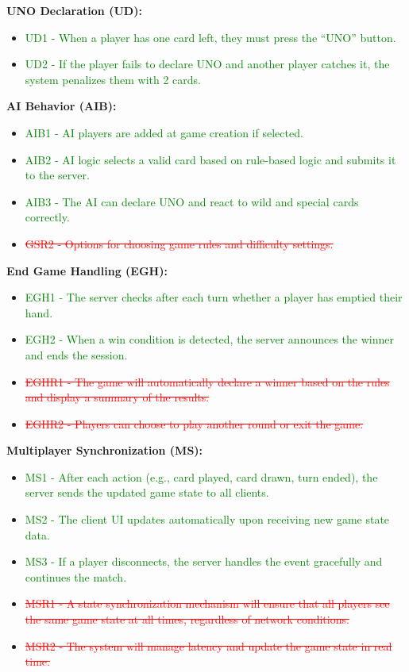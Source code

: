 \documentclass[12pt]{article}
\newcommand{\removed}[1]{\textcolor{red}{\sout{#1}}}
\newcommand{\added}[1]{\textcolor{green}{#1}}
\begin{document}
\textbf{UNO Declaration (UD):}
\begin{itemize}
    \item \added{UD1 - When a player has one card left, they must press the “UNO” button.}
    \item \added{UD2 - If the player fails to declare UNO and another player catches it, the system penalizes them with 2 cards.}
\end{itemize}

\textbf{AI Behavior (AIB):}
\begin{itemize}
    \item \added{AIB1 - AI players are added at game creation if selected.}
    \item \added{AIB2 - AI logic selects a valid card based on rule-based logic and submits it to the server.}
    \item \added{AIB3 - The AI can declare UNO and react to wild and special cards correctly.}
    \item \removed{GSR2 - Options for choosing game rules and difficulty settings.}
\end{itemize}

\textbf{End Game Handling (EGH):}
\begin{itemize}
    \item \added{EGH1 - The server checks after each turn whether a player has emptied their hand.}
    \item \added{EGH2 - When a win condition is detected, the server announces the winner and ends the session.}
    \item \removed{EGHR1 - The game will automatically declare a winner based on the rules and display a summary of the results.}
    \item \removed{EGHR2 - Players can choose to play another round or exit the game.}
\end{itemize}

\textbf{Multiplayer Synchronization (MS):}
\begin{itemize}
    \item \added{MS1 - After each action (e.g., card played, card drawn, turn ended), the server sends the updated game state to all clients.}
    \item \added{MS2 - The client UI updates automatically upon receiving new game state data.}
    \item \added{MS3 - If a player disconnects, the server handles the event gracefully and continues the match.}
    \item \removed{MSR1 - A state synchronization mechanism will ensure that all players see the same game state at all times, regardless of network conditions.}
    \item \removed{MSR2 - The system will manage latency and update the game state in real time.}
\end{itemize}
\end{document}
